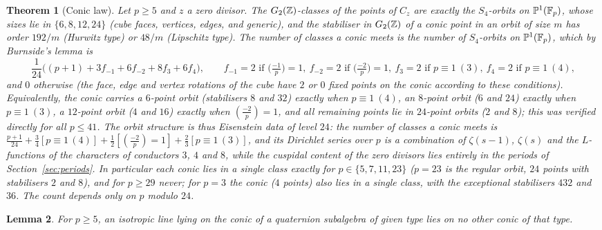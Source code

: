 \documentclass[11pt]{amsart}
\newtheorem{theorem}{Theorem}[section]
\newtheorem{lemma}[theorem]{Lemma}
\theoremstyle{definition}
\begin{document}
\begin{theorem}[Conic law]\label{thm:conic}
Let $p\ge 5$ and $z$ a zero divisor. The $G_2(\mathbb{Z})$-classes of the points of $C_z$ are exactly the $S_4$-orbits on $\mathbb P^1(\mathbb{F}_p)$, whose sizes lie in $\{6,8,12,24\}$ (cube faces, vertices, edges, and generic), and the stabiliser in $G_2(\mathbb{Z})$ of a conic point in an orbit of size $m$ has order $192/m$ (Hurwitz type) or $48/m$ (Lipschitz type). The number of classes a conic meets is the number of $S_4$-orbits on $\mathbb P^1(\mathbb{F}_p)$, which by Burnside's lemma is
\[\frac{1}{24}\Big((p+1)+3f_{-1}+6f_{-2}+8f_3+6f_4\Big),\qquad f_{-1}=2\text{ if }\big(\tfrac{-1}{p}\big)=1,\ f_{-2}=2\text{ if }\big(\tfrac{-2}{p}\big)=1,\ f_3=2\text{ if }p\equiv1\ (3),\ f_4=2\text{ if }p\equiv1\ (4),\]
and $0$ otherwise (the face, edge and vertex rotations of the cube have $2$ or $0$ fixed points on the conic according to these conditions). Equivalently, the conic carries a $6$-point orbit (stabilisers $8$ and $32$) exactly when $p\equiv1\ (4)$, an $8$-point orbit ($6$ and $24$) exactly when $p\equiv1\ (3)$, a $12$-point orbit ($4$ and $16$) exactly when $(\tfrac{-2}{p})=1$, and all remaining points lie in $24$-point orbits ($2$ and $8$); this was verified directly for all $p\le 41$. The orbit structure is thus Eisenstein data of level $24$: the number of classes a conic meets is $\tfrac{p+1}{24}+\tfrac34[p\equiv1\,(4)]+\tfrac12[(\tfrac{-2}{p})=1]+\tfrac23[p\equiv1\,(3)]$, and its Dirichlet series over $p$ is a combination of $\zeta(s-1)$, $\zeta(s)$ and the $L$-functions of the characters of conductors $3$, $4$ and $8$, while the cuspidal content of the zero divisors lies entirely in the periods of Section~\ref{sec:periods}. In particular each conic lies in a single class exactly for $p\in\{5,7,11,23\}$ ($p=23$ is the regular orbit, $24$ points with stabilisers $2$ and $8$), and for $p\ge 29$ never; for $p=3$ the conic ($4$ points) also lies in a single class, with the exceptional stabilisers $432$ and $36$. The count depends only on $p$ modulo $24$.
\end{theorem}
\begin{lemma}\label{lem:unique}
For $p\ge 5$, an isotropic line lying on the conic of a quaternion subalgebra of given type lies on no other conic of that type.
\end{lemma}
\end{document}
